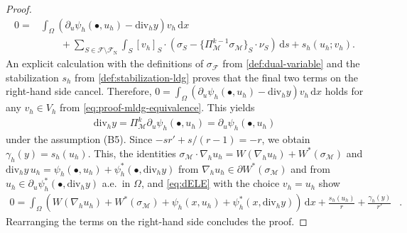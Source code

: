 \documentclass[10pt,a4paper]{amsart}
\newcommand{\Mcal}{\mathcal{M}}
\renewcommand{\div}{\mathrm{div}}
\renewcommand{\d}[1]{\,\mathrm{d}#1}
\begin{document}
\begin{proof}
\begin{align}
		0 = &\int_\Omega (\partial_u \psi_h(\bullet, u_h) - \div_h y) v_h \d{x}\nonumber\\
		&\qquad + \sum_{S \in \mathcal{F} \setminus \mathcal{F}_\mathrm{N}} \int_S [v_h]_S \cdot (\sigma_S - \{\Pi_\Mcal^{k-1} \sigma_\Mcal\}_S \cdot \nu_S) \d{s} + s_h(u_h;v_h).
	\end{align}
	An explicit calculation with
	the definitions of $\sigma_\mathcal{F}$ from \eqref{def:dual-variable} and the stabilization $s_h$ from \eqref{def:stabilization-ldg} proves that the final two terms on the right-hand side cancel. Therefore, $0 = \int_\Omega (\partial_u \psi_h(\bullet, u_h) - \div_h y) v_h \d{x}$ holds for any $v_h \in V_h$ from \eqref{eq:proof-mldg-equivalence}. This yields
	\begin{align}\label{eq:div_h_sigma_h}
		\div_h y = \Pi_\Mcal^k \partial_u \psi_h(\bullet,u_h) = \partial_u \psi_h(\bullet,u_h)
	\end{align}
	under the assumption (B5).
	Since $-sr' + s/(r-1) = -r$, we obtain $\gamma_h(y) = s_h(u_h)$.
	This, the identities $\sigma_\Mcal \cdot \nabla_h u_h = W(\nabla_h u_h) + W^*(\sigma_\Mcal)$ and $\div_h y\,u_h = \psi_h(\bullet,u_h) + \psi_h^*(\bullet,\div_h y)$ from $\nabla_h u_h \in \partial W^*(\sigma_\Mcal)$ and from $u_h \in \partial_u \psi_h^*(\bullet,\div_h y)$ a.e.~in $\Omega$, and \eqref{eq:dELE} with the choice $v_h = u_h$ show
	\begin{align*}
		0 = \int_\Omega (W(\nabla_h u_h) + W^*(\sigma_\Mcal) + \psi_h(x,u_h) + \psi_h^*(x,\div_h y)) \d{x} + \frac{s_h(u_h)}{r} + \frac{\gamma_h(y)}{r'}&.
	\end{align*}
	Rearranging the terms on the right-hand side concludes the proof. 
\end{proof}
\end{document}
